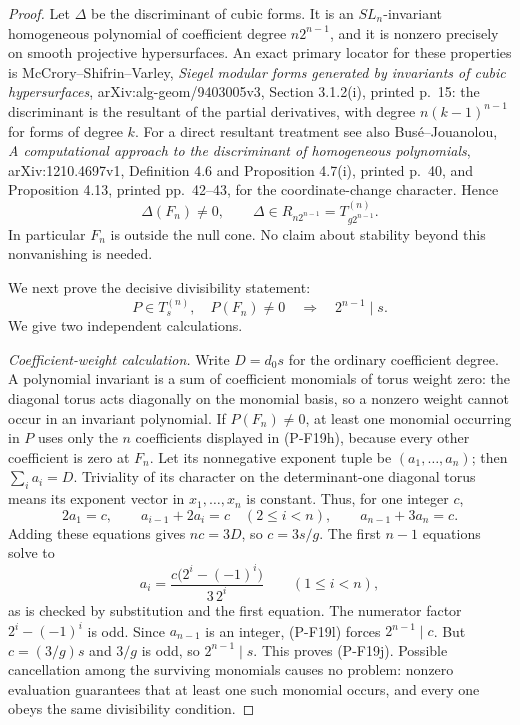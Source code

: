 \documentclass[11pt,a4paper]{article}
\begin{document}
\begin{proof}
Let $\Delta$ be the discriminant of cubic forms. It is an
$SL_n$-invariant homogeneous polynomial of coefficient degree
$n2^{n-1}$, and it is nonzero precisely on smooth projective
hypersurfaces. An exact primary locator for these properties is
McCrory--Shifrin--Varley, \emph{Siegel modular forms generated by
invariants of cubic hypersurfaces}, arXiv:alg-geom/9403005v3,
Section 3.1.2(i), printed p.~15: the discriminant is the resultant
of the partial derivatives, with degree $n(k-1)^{n-1}$ for forms
of degree $k$.
For a direct resultant treatment see also Bus\'e--Jouanolou,
\emph{A computational approach to the discriminant of homogeneous
polynomials}, arXiv:1210.4697v1, Definition 4.6 and
Proposition 4.7(i), printed p.~40, and Proposition 4.13,
printed pp.~42--43, for the coordinate-change character.
Hence
\[
 \Delta(F_n)\ne0,\qquad
 \Delta\in R_{n2^{n-1}}
      =T^{(n)}_{g2^{n-1}}.
 \tag{P-F19i}
\]
In particular $F_n$ is outside the null cone. No claim about
stability beyond this nonvanishing is needed.

We next prove the decisive divisibility statement:
\[
 P\in T^{(n)}_s,\quad P(F_n)\ne0
       \quad\Longrightarrow\quad 2^{n-1}\mid s.
 \tag{P-F19j}
\]
We give two independent calculations.

\emph{Coefficient-weight calculation.}
Write $D=d_0s$ for the ordinary coefficient degree. A polynomial
invariant is a sum of coefficient monomials of torus weight zero:
the diagonal torus acts diagonally on the monomial basis, so a
nonzero weight cannot occur in an invariant polynomial.
If $P(F_n)\ne0$, at least one monomial occurring in $P$ uses
only the $n$ coefficients displayed in (P-F19h), because every
other coefficient is zero at $F_n$. Let its nonnegative exponent
tuple be $(a_1,\ldots,a_n)$; then $\sum_i a_i=D$.
Triviality of its character on the determinant-one diagonal torus
means its exponent vector in $x_1,\ldots,x_n$ is constant.
Thus, for one integer $c$,
\[
 2a_1=c,\qquad
 a_{i-1}+2a_i=c\quad(2\le i<n),\qquad
 a_{n-1}+3a_n=c.
 \tag{P-F19k}
\]
Adding these equations gives $nc=3D$, so $c=3s/g$.
The first $n-1$ equations solve to
\[
 a_i=\frac{c\bigl(2^i-(-1)^i\bigr)}{3\,2^i}
       \qquad(1\le i<n),
 \tag{P-F19l}
\]
as is checked by substitution and the first equation.
The numerator factor $2^i-(-1)^i$ is odd. Since $a_{n-1}$
is an integer, (P-F19l) forces $2^{n-1}\mid c$.
But $c=(3/g)s$ and $3/g$ is odd, so $2^{n-1}\mid s$.
This proves (P-F19j). Possible cancellation among the surviving
monomials causes no problem: nonzero evaluation guarantees that
at least one such monomial occurs, and every one obeys the same
divisibility condition.


\end{proof}
\end{document}
